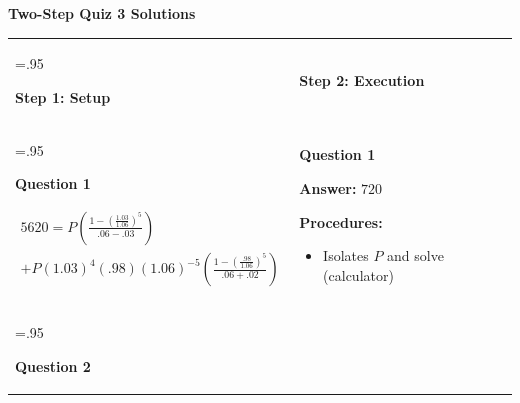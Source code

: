 \documentclass[11pt]{article}
\begin{document}
\begin{center}
{\Large \textbf{Two-Step Quiz 3 Solutions}}
\end{center}

\vspace{8pt}

\begin{tabularx}{\linewidth}{>{\hsize=.95\hsize}X >{\hsize=1.05\hsize}X}

\begin{tcolorbox}[colback=HeaderGray]
\centering \textbf{Step 1: Setup}
\end{tcolorbox}
&
\begin{tcolorbox}[colback=HeaderGray]
\centering \textbf{Step 2: Execution}
\end{tcolorbox}
\\

\begin{tcolorbox}[height=5cm,valign=top]
\textbf{Question 1}

\vspace{.125cm}

\begin{small}

\begin{align*}
5620=P\left(\frac{1-(\frac{1.03}{1.06})^5}{.06-.03}\right) \\ +P(1.03)^4(.98)(1.06)^{-5} \left(\frac{1-(\frac{.98}{1.06})^5}{.06+.02}\right)
\end{align*}

\end{small}
\end{tcolorbox}
&
\begin{tcolorbox}[height=5cm,valign=top]
\textbf{Question 1}

\begin{center}
\textbf{Answer:} $720$
\end{center}

\textbf{Procedures:}
\begin{itemize} 
    \item Isolates $P$ and solve (calculator)
\end{itemize}
\end{tcolorbox}
\\[6pt]


\begin{tcolorbox}[height=5cm,valign=top]
\textbf{Question 2}


\end{tcolorbox}
\end{tabularx}
\end{document}
